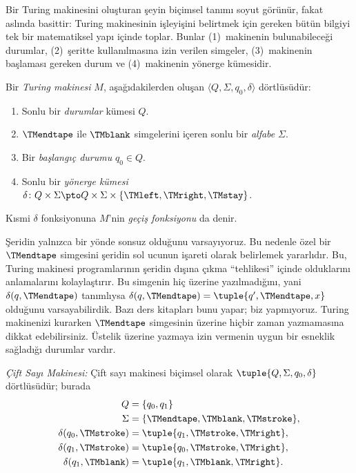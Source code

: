 


\begin{explain}
Bir Turing makinesini oluşturan şeyin biçimsel tanımı soyut görünür, fakat
aslında basittir: Turing makinesinin işleyişini belirtmek için gereken bütün
bilgiyi tek bir matematiksel yapı içinde toplar. Bunlar (1)~makinenin
bulunabileceği durumlar, (2)~şeritte kullanılmasına izin verilen simgeler,
(3)~makinenin başlaması gereken durum ve (4)~makinenin yönerge kümesidir.
\end{explain}

\begin{defn}
Bir \emph{Turing makinesi} $M$, aşağıdakilerden oluşan
$\langle Q,\Sigma,q_0,\delta\rangle$ dörtlüsüdür:
\begin{enumerate}
\item Sonlu bir \emph{durumlar} kümesi $Q$.
\item $\TMendtape$ ile $\TMblank$ simgelerini içeren sonlu bir
  \emph{alfabe} $\Sigma$.
\item Bir \emph{başlangıç durumu} $q_0\in Q$.
\item Sonlu bir \emph{yönerge kümesi}
  $\delta\colon Q\times\Sigma\pto
  Q\times\Sigma\times\{\TMleft,\TMright,\TMstay\}$.
\end{enumerate}
Kısmi $\delta$ fonksiyonuna $M$'nin \emph{geçiş fonksiyonu} da denir.
\end{defn}

\begin{explain}
Şeridin yalnızca bir yönde sonsuz olduğunu varsayıyoruz. Bu nedenle özel bir
$\TMendtape$ simgesini şeridin sol ucunun işareti olarak belirlemek
yararlıdır. Bu, Turing makinesi programlarının şeridin dışına çıkma
``tehlikesi'' içinde olduklarını anlamalarını kolaylaştırır. Bu simgenin hiç
üzerine yazılmadığını, yani $\delta(q,\TMendtape)$ tanımlıysa
$\delta(q,\TMendtape)=\tuple{q',\TMendtape,x}$ olduğunu varsayabilirdik.
Bazı ders kitapları bunu yapar; biz yapmıyoruz. Turing makinenizi kurarken
$\TMendtape$ simgesinin üzerine hiçbir zaman yazmamasına dikkat edebilirsiniz.
Üstelik üzerine yazmaya izin vermenin uygun bir esneklik sağladığı durumlar
vardır.
\end{explain}

\begin{ex}
\emph{Çift Sayı Makinesi:} Çift sayı makinesi biçimsel olarak
$\tuple{Q,\Sigma,q_0,\delta}$ dörtlüsüdür; burada
\begin{align*}
Q & = \{q_0,q_1\}\\
\Sigma & = \{\TMendtape,\TMblank,\TMstroke\},\\
\delta(q_0,\TMstroke) & = \tuple{q_1,\TMstroke,\TMright},\\
\delta(q_1,\TMstroke) & = \tuple{q_0,\TMstroke,\TMright},\\
\delta(q_1,\TMblank) & = \tuple{q_1,\TMblank,\TMright}.
\end{align*}
\end{ex}


